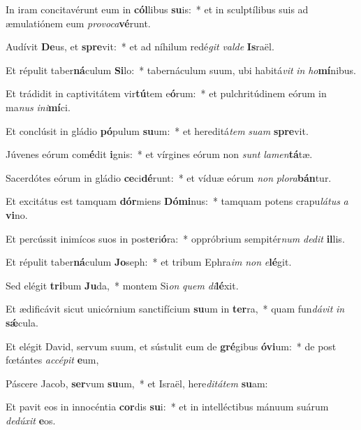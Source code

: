 \item In iram concitavérunt eum in \textbf{cól}libus \textbf{su}is:~* et in sculptílibus suis ad æmulatiónem eum \textit{pro}\textit{vo}\textit{ca}\textbf{vé}runt.
\item Audívit \textbf{De}us, et \textbf{spre}vit:~* et ad níhilum redé\textit{git} \textit{val}\textit{de} \textbf{Is}raël.
\item Et répulit taber\textbf{ná}culum \textbf{Si}lo:~* tabernáculum suum, ubi habitá\textit{vit} \textit{in} \textit{ho}\textbf{mí}nibus.
\item Et trádidit in captivitátem vir\textbf{tú}tem e\textbf{ó}rum:~* et pulchritúdinem eórum in ma\textit{nus} \textit{in}\textit{i}\textbf{mí}ci.
\item Et conclúsit in gládio \textbf{pó}pulum \textbf{su}um:~* et hereditá\textit{tem} \textit{su}\textit{am} \textbf{spre}vit.
\item Júvenes eórum com\textbf{é}dit \textbf{i}gnis:~* et vírgines eórum non \textit{sunt} \textit{la}\textit{men}\textbf{tá}tæ.
\item Sacerdótes eórum in gládio \textbf{ce}ci\textbf{dé}runt:~* et víduæ eórum \textit{non} \textit{plo}\textit{ra}\textbf{bán}tur.
\item Et excitátus est tamquam \textbf{dór}miens \textbf{Dó}\textbf{mi}nus:~* tamquam potens crapu\textit{lá}\textit{tus} \textit{a} \textbf{vi}no.
\item Et percússit inimícos suos in post\textbf{e}ri\textbf{ó}ra:~* oppróbrium sempitér\textit{num} \textit{de}\textit{dit} \textbf{il}lis.
\item Et répulit taber\textbf{ná}culum \textbf{Jo}seph:~* et tribum Ephra\textit{im} \textit{non} \textit{e}\textbf{lé}git.
\item Sed elégit \textbf{tri}bum \textbf{Ju}da,~* montem Si\textit{on} \textit{quem} \textit{di}\textbf{lé}xit.
\item Et ædificávit sicut unicórnium sanctifícium \textbf{su}um in \textbf{ter}ra,~* quam fun\textit{dá}\textit{vit} \textit{in} \textbf{sǽ}cula.
\item Et elégit David, servum suum, et sústulit eum de \textbf{gré}gibus \textbf{ó}\textbf{vi}um:~* de post fœtántes \textit{ac}\textit{cé}\textit{pit} \textbf{e}um,
\item Páscere Jacob, \textbf{ser}vum \textbf{su}um,~* et Israël, here\textit{di}\textit{tá}\textit{tem} \textbf{su}am:
\item Et pavit eos in innocéntia \textbf{cor}dis \textbf{su}i:~* et in intelléctibus mánuum suárum \textit{de}\textit{dú}\textit{xit} \textbf{e}os.
